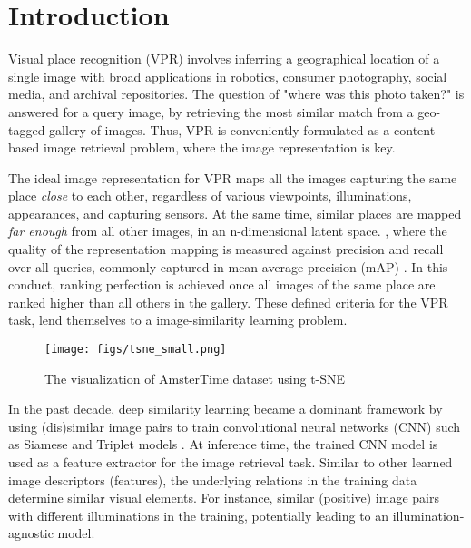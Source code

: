 \documentclass[a4paper,conference]{IEEEtran}
\begin{document}
\IEEEpeerreviewmaketitle



\section{Introduction}
\label{sec:introduction}

Visual place recognition (VPR) involves inferring a geographical location of a single image with  broad applications in robotics, consumer photography, social media, and archival repositories. The question of "where was this photo taken?" is answered for a query image, by retrieving the most similar match from a geo-tagged gallery of images. Thus, VPR is conveniently formulated as a content-based image retrieval problem, where the image representation is key. 

The ideal image representation for VPR  maps all the images capturing the same place {\textit{close}} to each other, regardless of various viewpoints, illuminations, appearances, and capturing sensors. At the same time, similar places are mapped {\textit{far enough}} from all other images, in an n-dimensional latent space. \cite{Serajeh2020}, where the quality of the representation mapping is measured against precision and recall over all queries, commonly captured in mean average precision (mAP) \cite{revaud2019apgem}. In this conduct, ranking perfection is achieved once all images of the same place are ranked higher than all others in the gallery. These defined criteria for the VPR task, lend themselves to a image-similarity learning problem.  

\begin{figure}
\begin{center}
\texttt{[image: figs/tsne\_small.png]}
\end{center}
\caption{The visualization of AmsterTime dataset using t-SNE}
\label{fig:tsne}
\end{figure}


In the past decade, deep similarity learning became a dominant framework by using (dis)similar image pairs to train convolutional neural networks (CNN)  such as Siamese \cite{Koch2015SiameseNN} and Triplet models \cite{Hoffer2015DeepML,balntas2016learning}.  At  inference time, the trained CNN model is used as a feature extractor for the image retrieval task. Similar to other learned image descriptors (features), the underlying relations in the training data determine similar visual elements. For instance, similar (positive) image pairs with different illuminations in the training, potentially leading to an illumination-agnostic model.
 
\end{document}
